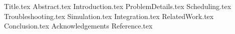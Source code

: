 \documentclass{acm_proc_article-sp}
\begin{document}
 {Title.tex}
 {Abstract.tex}
 {Introduction.tex}
 {ProblemDetails.tex}
 {Scheduling.tex}
 {Troubleshooting.tex}
 {Simulation.tex}
 {Integration.tex}
 {RelatedWork.tex}
 {Conclusion.tex}
 {Acknowledgements}
 {Reference.tex}
\end{document}
